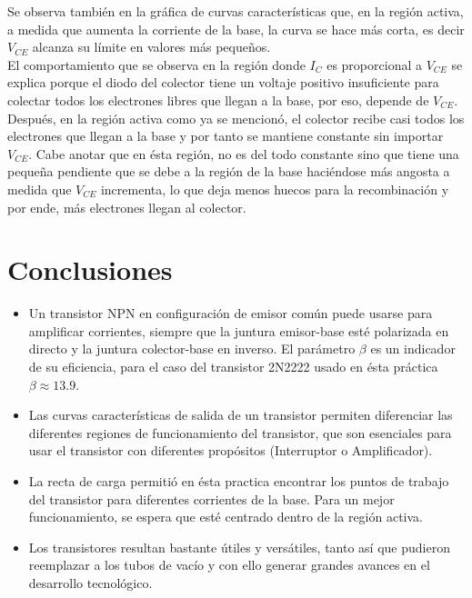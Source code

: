 Se observa también en la gráfica de curvas características que, en la región activa, a medida que aumenta la corriente de la base, la curva se hace más corta, es decir $V_{CE}$ alcanza su límite en valores más pequeños.\\
El comportamiento que se observa en la región donde $I_{C}$ es proporcional a $V_{CE}$ se explica porque el diodo del colector tiene un voltaje positivo insuficiente para colectar todos los electrones libres que llegan a la base, por eso, depende de $V_{CE}$.
Después, en la región activa como ya se mencionó, el colector recibe casi todos los electrones que llegan a la base y por tanto se mantiene constante sin importar $V_{CE}$. Cabe anotar que en ésta región, no es del todo constante sino que tiene una pequeña pendiente que se debe a la región de la base haciéndose más angosta a medida que $V_{CE}$ incrementa, lo que deja menos huecos para la recombinación y por ende, más electrones llegan al colector.
\section{Conclusiones}
\begin{itemize}
    \item Un transistor NPN en configuración de emisor común puede usarse para amplificar corrientes, siempre que la juntura emisor-base esté polarizada en directo y la juntura colector-base en inverso. El parámetro $\beta$ es un indicador de su eficiencia, para el caso del transistor 2N2222 usado en ésta práctica $\beta \approx 13.9$.
    \item Las curvas características de salida de un transistor permiten diferenciar las diferentes regiones de funcionamiento del transistor, que son esenciales para usar el transistor con diferentes propósitos (Interruptor o Amplificador).
    \item La recta de carga permitió en ésta practica encontrar los puntos de trabajo del transistor para diferentes corrientes de la base. Para un mejor funcionamiento, se espera que esté centrado dentro de la región activa.
    \item Los transistores resultan bastante útiles y versátiles, tanto así que pudieron reemplazar a los tubos de vacío y con ello generar grandes avances en el desarrollo tecnológico.
\end{itemize}
